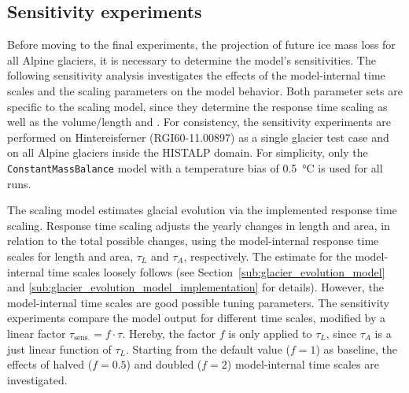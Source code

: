
    \subsection{Sensitivity experiments} %
    \label{sub:sensitivity_experiments_setup}
        Before moving to the final experiments, the projection of future ice mass loss for all Alpine glaciers, it is necessary to determine the model's sensitivities. The following sensitivity analysis investigates the effects of the model-internal time scales and the scaling parameters on the model behavior. Both parameter sets are specific to the scaling model, since they determine the response time scaling as well as the volume/length and \vas{}. For consistency, the sensitivity experiments are performed on Hintereisferner (RGI60-11.00897) as a single glacier test case and on all Alpine glaciers inside the HISTALP domain. For simplicity, only the \lstinline`ConstantMassBalance` model with a temperature bias of \SI{+0.5}{\celsius} is used for all runs.

        The scaling model estimates glacial evolution via the implemented response time scaling. Response time scaling adjusts the yearly changes in length and area, in relation to the total possible changes, using the model-internal response time scales for length and area, $\tau_L$ and  $\tau_A$, respectively.
        The estimate for the model-internal time scales loosely follows \citet{Johannesson1989} (see Section~\ref{sub:glacier_evolution_model} and \ref{sub:glacier_evolution_model_implementation} for details). However, the model-internal time scales are good possible tuning parameters. The sensitivity experiments compare the model output for different time scales, modified by a linear factor $\tau_\text{sens.} = f \cdot \tau$. Hereby, the factor $f$ is only applied to $\tau_L$, since $\tau_A$ is a just linear function of $\tau_L$. Starting from the default value ($f=1$) as baseline, the effects of halved ($f=0.5$) and doubled ($f=2$) model-internal time scales are investigated.

